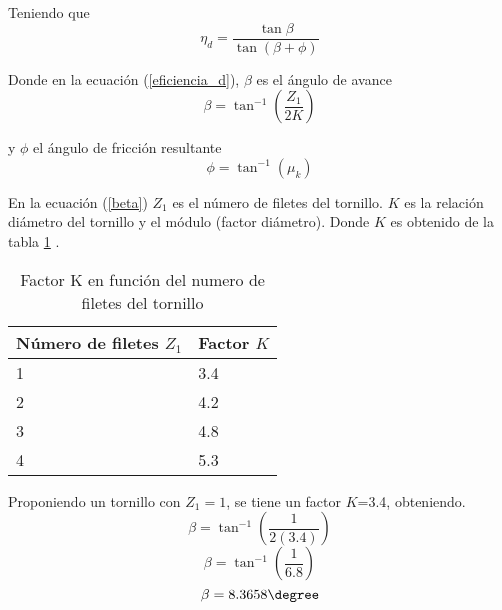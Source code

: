 Teniendo que
\begin{equation} \label{eficiencia_d}
    \eta_d=\frac{\tan{\beta}}{\tan{(\beta+\phi)}}
\end{equation}

Donde en la ecuación (\ref{eficiencia_d}), $\beta$ es el ángulo de avance
\begin{equation} \label{beta}
    \beta=\tan^{-1}\left( \frac{Z_1}{2K}\right)
\end{equation}

y $\phi$ el ángulo de fricción resultante
\begin{equation}\label{phi}
    \phi=\tan^{-1}\left( \mu_k \right)
\end{equation}

En la ecuación (\ref{beta}) \hfill \break $Z_1$ es el número de filetes del tornillo.\hfill \break
$K$ es la relación diámetro del tornillo y el módulo (factor diámetro).\hfill \break
Donde $K$ es obtenido de la tabla \ref{tab:FactorK} \cite{Rodriguez2015}.

\footnotesize
\begin{longtable}[!htb]{| m{15em}| m{10em}|}
\caption{Factor K en función del numero de filetes del tornillo}
\label{tab:FactorK} \\
\hline\hline
\textbf{Número de filetes $Z_1$}& \textbf{Factor $K$} \\
\hline\hline
1 & 3.4 \\
\hline
2 & 4.2 \\
\hline
3 & 4.8 \\
\hline
4 & 5.3 \\
\hline 
\end{longtable}
Proponiendo un tornillo con $Z_1=1$, se tiene un factor $K$=3.4, obteniendo.
\begin{equation*}
    \beta=\tan^{-1}\left( \frac{1}{2(3.4)}\right)
\end{equation*}
\begin{equation*}
    \beta=\tan^{-1}\left( \frac{1}{6.8}\right)
\end{equation*}
\begin{equation*}
    \beta=8.3658\degree
\end{equation*}

